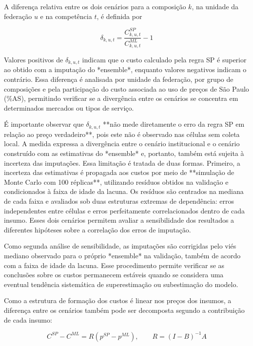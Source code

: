 A diferença relativa entre os dois cenários para a composição \(k\), na unidade da federação \(u\) e na competência \(t\), é 
definida por

\begin{equation} \delta_{k,u,t} = \frac{C^{SP}_{k,u,t}} {C^{ML}_{k,u,t}} - 1 \label{eq:delta-custos} \end{equation}

Valores positivos de \(\delta_{k,u,t}\) indicam que o custo calculado pela regra SP é superior ao obtido com a imputação do 
*ensemble*, enquanto valores negativos indicam o contrário. Essa diferença é analisada por unidade da federação, por grupo 
de composições e pela participação do custo associada ao uso de preços de São Paulo (\%AS), permitindo verificar se a divergência 
entre os cenários se concentra em determinados mercados ou tipos de serviço.

É importante observar que \(\delta_{k,u,t}\) **não mede diretamente o erro da regra SP em relação ao preço verdadeiro**, 
pois este não é observado nas células sem coleta local. A medida expressa a divergência entre o cenário institucional e o 
cenário construído com as estimativas do *ensemble* e, portanto, também está sujeita à incerteza das imputações. Essa limitação 
é tratada de duas formas. Primeiro, a incerteza das estimativas é propagada aos custos por meio de **simulação de Monte Carlo 
com 100 réplicas**, utilizando resíduos obtidos na validação e condicionados à faixa de idade da lacuna. Os resíduos são 
centrados na mediana de cada faixa e avaliados sob duas estruturas extremas de dependência: erros independentes entre células 
e erros perfeitamente correlacionados dentro de cada insumo. Esses dois cenários permitem avaliar a sensibilidade dos resultados 
a diferentes hipóteses sobre a correlação dos erros de imputação.

Como segunda análise de sensibilidade, as imputações são corrigidas pelo viés mediano observado para o próprio *ensemble* na 
validação, também de acordo com a faixa de idade da lacuna. Esse procedimento permite verificar se as conclusões sobre os custos 
permanecem estáveis quando se considera uma eventual tendência sistemática de superestimação ou subestimação do modelo.

Como a estrutura de formação dos custos é linear nos preços dos insumos, a diferença entre os cenários também pode ser decomposta 
segundo a contribuição de cada insumo:

\begin{equation} C^{SP} - C^{ML} = R\left(p^{SP} - p^{ML}\right), \qquad R = (I-B)^{-1}A \label{eq:decomposicao-custos} \end{equation}

